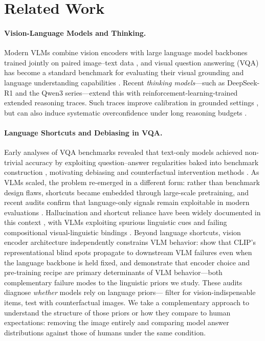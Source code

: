 \section{Related Work}

\paragraph{Vision-Language Models and Thinking.}
Modern VLMs combine vision encoders with large language model backbones trained
jointly on paired image--text data \citep{liu2023visual,zhang2023multimodal}, and
visual question answering (VQA) has become a standard benchmark for evaluating their
visual grounding and language understanding capabilities \citep{antol2015vqa,goyal2016making}.
Recent \emph{thinking models}---such as DeepSeek-R1 \citep{deepseekai2025deepseekr1}
and the Qwen3 series---extend this with reinforcement-learning-trained extended
reasoning traces. Such traces improve calibration in grounded settings
\citep{yoon2025reasoningconfidence}, but can also induce systematic overconfidence
under long reasoning budgets \citep{lacombe2025dontthink}.

\paragraph{Language Shortcuts and Debiasing in VQA.}
Early analyses of VQA benchmarks revealed that text-only models achieved
non-trivial accuracy by exploiting question--answer regularities baked into
benchmark construction \citep{jabri2016revisiting,zhang2016yin,agrawal2018dont},
motivating debiasing and counterfactual intervention methods
\citep{cadene2019rubi,clark2019dont,teney2020learning,niu2021counterfactual}. As VLMs scaled, the problem re-emerged in a
different form: rather than benchmark design flaws, shortcuts became embedded
through large-scale pretraining, and recent audits confirm that language-only
signals remain exploitable in modern evaluations \citep{chen2024are,lee2024vlind}.
Hallucination and shortcut reliance have been widely documented in this context
\citep{ji2023survey,rohrbach2018object,xiao2021hallucination}, with VLMs
exploiting spurious linguistic cues \citep{han2024instinctive,ye2024mmspubench}
and failing compositional visual-linguistic bindings \citep{yuksekgonul2023when}.
Beyond language shortcuts, vision encoder architecture independently constrains VLM behavior: \citet{tong2024eyes} show that CLIP's representational blind spots propagate to downstream VLM failures even when the language backbone is held fixed, and \citet{mckinzie2024mm1} demonstrate that encoder choice and pre-training recipe are primary determinants of VLM behavior---both complementary failure modes to the linguistic priors we study.
These audits diagnose \emph{whether} models rely on language priors---\citet{chen2024are}
filter for vision-indispensable items, \citet{lee2024vlind} test with counterfactual
images. We take a complementary approach to understand the structure of those priors or how they compare to human expectations: removing the image
entirely and comparing model answer distributions against those of humans under the same condition.

